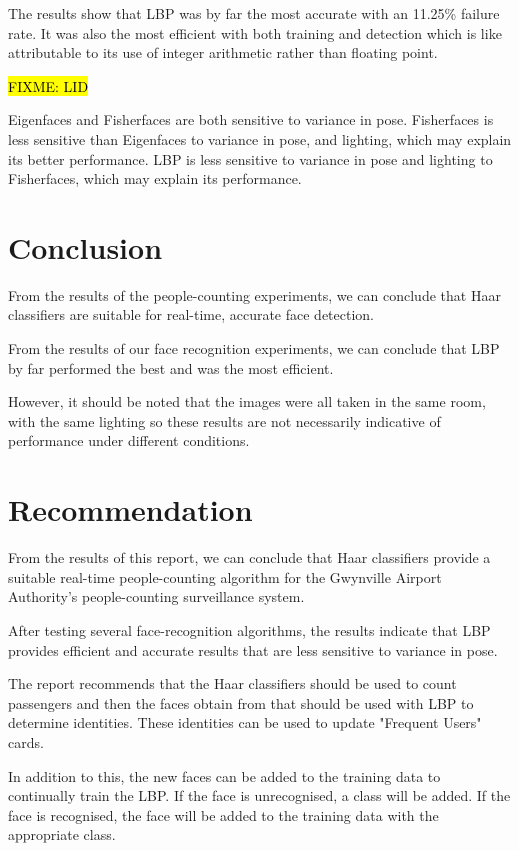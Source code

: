 \documentclass{article}
\begin{document}
The results show that LBP was by far the most accurate with an 11.25\% failure rate. It was also the most efficient with both training and detection which is like attributable to its use of integer arithmetic rather than floating point.

\hl{FIXME: LID}

Eigenfaces and Fisherfaces are both sensitive to variance in pose. Fisherfaces is less sensitive than Eigenfaces to variance in pose, and lighting, which may explain its better performance. LBP is less sensitive to variance in pose and lighting to Fisherfaces, which may explain its performance.

\section{Conclusion}
From the results of the people-counting experiments, we can conclude that Haar classifiers are suitable for real-time, accurate face detection.

From the results of our face recognition experiments, we can conclude that LBP by far performed the best and was the most efficient.

However, it should be noted that the images were all taken in the same room, with the same lighting so these results are not necessarily indicative of performance under different conditions.

\section{Recommendation}
From the results of this report, we can conclude that Haar classifiers provide a suitable real-time people-counting algorithm for the Gwynville Airport Authority's  people-counting surveillance system.

After testing several face-recognition algorithms, the results indicate that LBP provides efficient and accurate results that are less sensitive to variance in pose.

The report recommends that the Haar classifiers should be used to count passengers and then the faces obtain from that should be used with LBP to determine identities. These identities can be used to update "Frequent Users" cards.

In addition to this, the new faces can be added to the training data to continually train the LBP. If the face is unrecognised, a class will be added. If the face is recognised, the face will be added to the training data with the appropriate class.
\end{document}
